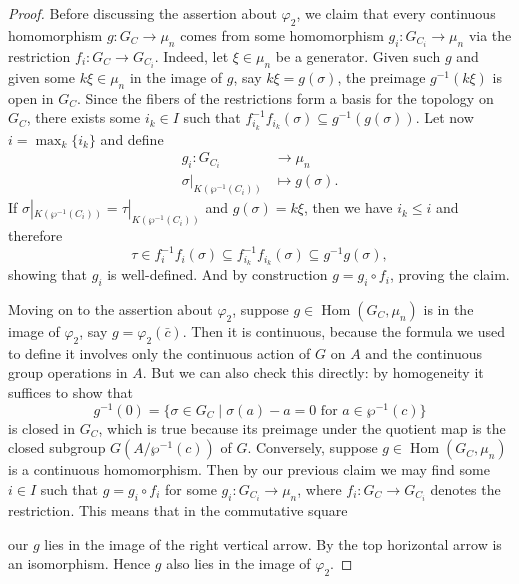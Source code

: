 \documentclass[12pt]{amsart}
\DeclareMathOperator{\Hom}{Hom}
\begin{document}
\begin{prop}
\begin{proof}
	Before discussing the assertion about $\varphi_{2}$, we claim that every continuous homomorphism $g\colon G_{C}\to \mu_{n}$ comes from some homomorphism $g_{i}\colon G_{C_{i}}\to \mu_{n}$ via the restriction $f_{i}\colon G_{C}\to G_{C_{i}}$.
	Indeed, let $\xi\in \mu_{n}$ be a generator.
	Given such $g$ and given some $k\xi\in \mu_{n}$ in the image of $g$, say $k\xi=g(\sigma)$, the preimage $g^{-1}(k\xi)$ is open in $G_{C}$.
	Since the fibers of the restrictions form a basis for the topology on $G_{C}$, there exists some $i_{k}\in I$ such that $f_{i_{k}}^{-1}f_{i_{k}}(\sigma)\subseteq g^{-1}(g(\sigma))$.
	Let now $i=\max_{k}\{ i_{k} \}$ and define
	\begin{align*}
	    g_{i}\colon G_{C_{i}} & \longrightarrow \mu_{n} \\
	    \sigma|_{K(\wp^{-1}(C_{i}))} & \longmapsto g(\sigma).
	\end{align*}
	If $\sigma|_{K(\wp^{-1}(C_{i}))}=\tau|_{K(\wp^{-1}(C_{i}))}$ and $g(\sigma)=k\xi$, then we have $i_{k}\leqslant i$ and therefore
	\[ \tau\in f_{i}^{-1}f_{i}(\sigma)\subseteq f_{i_{k}}^{-1}f_{i_{k}}(\sigma)\subseteq g^{-1}g(\sigma), \]
	showing that $g_{i}$ is well-defined.
	And by construction $g=g_{i}\circ f_{i}$, proving the claim.

	Moving on to the assertion about $\varphi_{2}$, suppose $g\in \Hom(G_{C},\mu_{n})$ is in the image of $\varphi_{2}$, say $g=\varphi_{2}(\bar{c})$.
	Then it is continuous, because the formula we used to define it involves only the continuous action of $G$ on $A$ and the continuous group operations in $A$.
	But we can also check this directly: by homogeneity it suffices to show that
	\[ g^{-1}(0)=\{ \sigma\in G_{C}\mid \sigma(a)-a=0 \text{ for }a\in \wp^{-1}(c) \} \]
	is closed in $G_{C}$, which is true because its preimage under the quotient map is the closed subgroup $G(A/\wp^{-1}(c))$ of $G$.
	Conversely, suppose $g\in \Hom(G_{C},\mu_{n})$ is a continuous homomorphism.
	Then by our previous claim we may find some $i\in I$ such that $g=g_{i}\circ f_{i}$ for some $g_{i}\colon G_{C_{i}}\to \mu_{n}$, where $f_{i}\colon G_{C}\to G_{C_{i}}$ denotes the restriction.
	This means that in the commutative square
	\begin{center}
	\end{center}
	our $g$ lies in the image of the right vertical arrow.
	By  the top horizontal arrow is an isomorphism.
	Hence $g$ also lies in the image of $\varphi_{2}$.
    \end{proof}
\end{prop}
\end{document}

